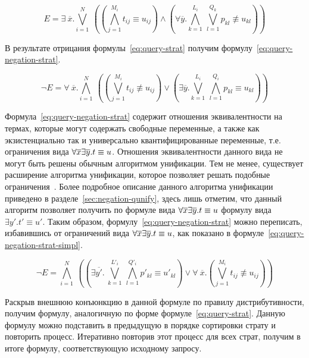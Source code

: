 \begin{equation}
E = \exists~\overline{x}.\bigvee_{i=1}^{N}~
  ((\bigwedge_{j=1}^{M_i}{t_{ij} \equiv u_{ij}}) 
  \wedge
  ({\forall\overline{y}.\bigwedge_{k=1}^{L_i}~\bigvee_{l=1}^{Q_k}{p_{kl} \not\equiv u_{kl}}})
  )
\label{eq:query-strat}
\end{equation}

В результате отрицания формулы~\ref{eq:query-strat}
получим формулу~\ref{eq:query-negation-strat}.

\begin{equation}
 \neg E = \forall~\overline{x}.\bigwedge_{i=1}^{N}~
    ((\bigvee_{j=1}^{M_i}{t_{ij} \not\equiv u_{ij}}) 
    \vee
    ({\exists\overline{y}.\bigvee_{k=1}^{L_i}~\bigwedge_{l=1}^{Q_i}{p_{kl} \equiv u_{kl}}})
    )
\label{eq:query-negation-strat}
\end{equation}

Формула~\ref{eq:query-negation-strat} содержит отношения эквивалентности на термах, 
которые могут содержать свободные переменные, а также как экзистенциально 
так и универсально квантифицированные переменные, 
т.е. ограничения вида $\forall{\overline{x}}\exists{\overline{y}}.t \equiv u$.
Отношения эквивалентности данного вида не могут быть решены 
обычным алгоритмом унификации.
Тем не менее, существует расширение алгоритма унификации,
которое позволяет решать подобные ограничения~\cite{liu1999constructive}.
Более подробное описание данного алгоритма унификации приведено в разделе~\ref{sec:negation-qunify},
здесь лишь отметим, что данный алгоритм позволяет 
получить по формуле вида $\forall{\overline{x}}\exists{\overline{y}}.t \equiv u$ 
формулу вида $\exists{y'}.t' \equiv u'$.
Таким образом, формулу~\ref{eq:query-negation-strat} можно переписать,
избавившись от ограничений вида $\forall{\overline{x}}\exists{\overline{y}}.t \equiv u$,
как показано в формуле~\ref{eq:query-negation-strat-simpl}.

\begin{equation}
\neg E = \bigwedge_{i=1}^{N}~
    (({\exists\overline{y'}.~\bigvee_{k=1}^{L'_i}~\bigwedge_{l=1}^{Q'_i}{p'_{kl} \equiv u'_{kl}}})
    \vee
    \forall~\overline{x}.
    (\bigvee_{j=1}^{M_i}{t_{ij} \not\equiv u_{ij}}))
\label{eq:query-negation-strat-simpl}
\end{equation}

Раскрыв внешнюю конъюнкцию в данной формуле по правилу дистрибутивности,
получим формулу, аналогичную по форме формуле~\ref{eq:query-strat}.
Данную формулу можно подставить в предыдущую в порядке сортировки страту и повторить процесс.
Итеративно повторив этот процесс для всех страт, получим в итоге формулу,
соответствующую исходному запросу.

